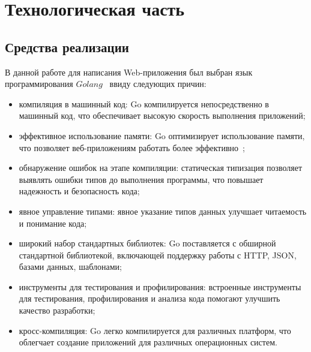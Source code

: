 \chapter{Технологическая часть}

\section{Средства реализации}
В данной работе для написания Web-приложения был выбран язык программирования $Golang$~\cite{golang} ввиду следующих причин:
\begin{itemize}
	\item компиляция в машинный код: Go компилируется непосредственно в машинный код, что обеспечивает высокую скорость выполнения приложений;
	\item эффективное использование памяти: Go оптимизирует использование памяти, что позволяет веб-приложениям работать более эффективно~\cite{goperf};
	\item обнаружение ошибок на этапе компиляции: статическая типизация позволяет выявлять ошибки типов до выполнения программы, что повышает надежность и безопасность кода;
	\item явное управление типами: явное указание типов данных улучшает читаемость и понимание кода;
	\item широкий набор стандартных библиотек: Go поставляется с обширной стандартной библиотекой, включающей поддержку работы с HTTP, JSON, базами данных, шаблонами;
	\item инструменты для тестирования и профилирования: встроенные инструменты для тестирования, профилирования и анализа кода помогают улучшить качество разработки;
	\item кросс-компиляция: Go легко компилируется для различных платформ, что облегчает создание приложений для различных операционных систем.

\end{itemize}

